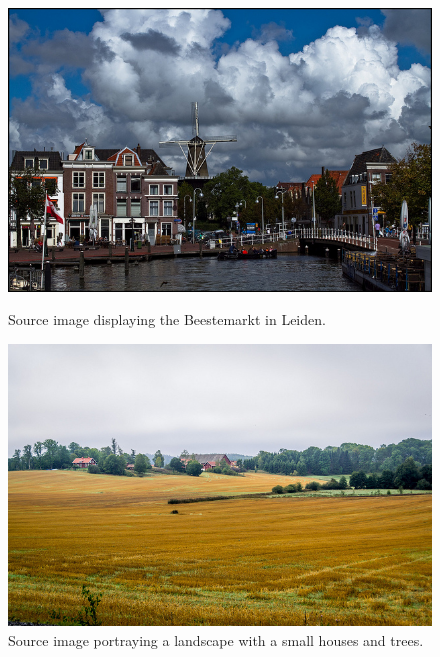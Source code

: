 \begin{figure}[H]
	\centering
	\includegraphics[width=1\linewidth]{img/beestemarkt.jpg}
	\caption{Source image displaying the Beestemarkt in Leiden\cite{imgbeestemarkt}.}
	\label{fig:imgbeestemarkt}
	\endminipage\hfill
	\centering
	\includegraphics[width=1\linewidth]{img/landscape.jpg}
	\caption{Source image portraying a landscape with a small houses and trees\cite{imglandscape}.}
	\label{fig:imglandscape}
	\endminipage\hfill
\end{figure}